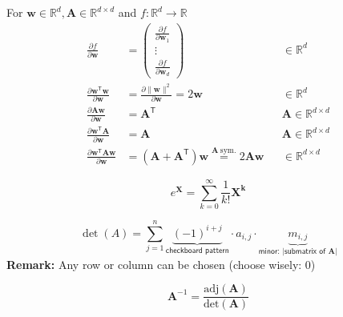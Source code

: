 \newpar{}
For $\mathbf{w}\in \mathbb{R}^d, \mathbf{A}\in \mathbb{R}^{d\times d}$ and $ f: \mathbb{R}^d\to \mathbb{R}$
\noindent\begin{align*}
    \frac{\partial f}{\partial \mathbf{w}}                                  & =
    \begin{pmatrix}\frac{\partial f}{\partial \mathbf{w}_1} \\
        \vdots                                   \\
        \frac{\partial f}{\partial \mathbf{w}_d}
    \end{pmatrix}  &                                                                                                                 & \in \mathbb{R}^d                                                                                                 \\[2em]
    \frac{\partial \mathbf{w}^{\mathsf{T}}\mathbf{w}}{\partial \mathbf{w}}  & =\frac{\partial\|\mathbf{w}\|^2}{\partial \mathbf{w}}=2\mathbf{w}                                               &                  & \in \mathbb{R}^d                     \\
    \frac{\partial \mathbf{A}\mathbf{w}}{\partial \mathbf{w}}               & ={\mathbf{A}}^{\mathsf{T}}                                                                                      &                  & \mathbf{A}\in \mathbb{R}^{d\times d} \\
    \frac{\partial \mathbf{w}^{\mathsf{T}}\mathbf{A}}{\partial \mathbf{w}}  & = \mathbf{A}                                                                                                    &                  & \mathbf{A}\in \mathbb{R}^{d\times d} \\
    \frac{\partial \mathbf{w}^{\mathsf{T}}\mathbf{Aw}}{\partial \mathbf{w}} & = \left(\mathbf{A}+\mathbf{A}^{\mathsf{T}}\right)\mathbf{w} \overset{\mathbf{A}\ \mathrm{sym.}}{=} 2\mathbf{Aw} &                  & \in \mathbb{R}^{d\times d}
\end{align*}

\newpar{}
\begin{equation*}
    e^{\mathbf{X}} = \sum_{k=0}^{\infty}\frac{1}{k!}\mathbf{X^k}
\end{equation*}

\newpar{}
\noindent\begin{equation*}
    \det(A)=\sum_{j=1}^n \underbrace{{(-1)}^{i+j}}_{\textsf{checkboard pattern}}\cdot a_{i,j}\cdot\underbrace{m_{i,j}}_{\textsf{minor: |submatrix of }\mathbf{A}|}
\end{equation*}
\textbf{Remark:} Any row or column can be chosen (choose wisely: 0)

\newpar{}
\begin{equation*}
    \mathbf{A}^{-1}  = \frac{\text{adj}(\mathbf{A})}{\text{det}(\mathbf{A})}
\end{equation*}
